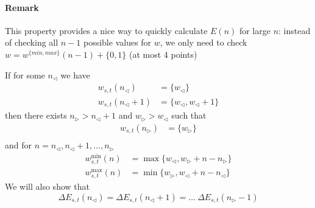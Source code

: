 \documentclass[]{article}
\begin{document}
\paragraph{Remark}
	This property provides a nice way to quickly calculate $E(n)$ for large $n$: instead of checking all $n-1$ possible values for $w$, we only need to check $w = w^{\{min,max\}}(n-1) + \{0, 1\}$ (at most 4 points)


\vspace{1cm}
\begin{lemma}[$w$-Parallelogram]
	If for some $n_{\triangleleft}$ we have
	\begin{align*}
	w_{s,t}(n_{\triangleleft}) &= \{w_{\triangleleft}\}\\
	w_{s,t}(n_{\triangleleft} + 1) &= \{w_{\triangleleft}, w_{\triangleleft} + 1\}
	\end{align*}
	then there exists $n_{\triangleright} > n_{\triangleleft} + 1$ and $w_{\triangleright} > w_{\triangleleft}$ such that
	\begin{align*}
	w_{s,t}(n_{\triangleright}) &= \{w_{\triangleright}\}\\
	\end{align*}
	and for $n = n_{\triangleleft}, n_{\triangleleft}+1,\dots,n_{\triangleright}$
	\begin{align*}
	w^{\min}_{s,t}(n) &= \max\{w_{\triangleleft}, w_{\triangleright} + n - n_{\triangleright}\}\\
	w^{\max}_{s,t}(n) &= \min\{w_{\triangleright}, w_{\triangleleft} + n - n_{\triangleleft}\}
	\end{align*}
	We will also show that
	\[
	\Delta E_{s,t}(n_{\triangleleft}) = \Delta E_{s,t}(n_{\triangleleft} + 1) = \dots \ \Delta E_{s,t}(n_{\triangleright} - 1)
	\]
\end{lemma}
\end{document}
